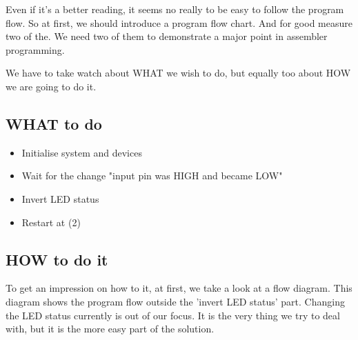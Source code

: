 Even if it's a better reading, it seems no really to be easy to follow the program flow. So at first, we should introduce a program flow chart. And for good measure two of the. We need two of them to demonstrate a major point in assembler programming.

We have to take watch about WHAT we wish to do, but equally too about HOW we are going to do it.

\subsection{WHAT to do}

\begin{itemize}
  \item Initialise system and devices
  \item Wait for the change "input pin was HIGH and became LOW"
  \item Invert LED status
  \item Restart at (2)
\end{itemize}


\subsection{HOW to do it}

To get an impression on how to it, at first, we take a look at a flow diagram. This diagram shows the program flow outside the 'invert LED status' part. Changing the LED status currently is out of our focus. It is the very thing we try to deal with, but it is the more easy part of the solution.

